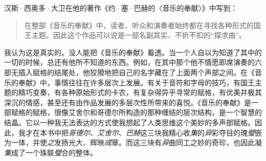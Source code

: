 汉斯·西奥多·大卫在他的著作《约·塞·巴赫的〈音乐的奉献〉》中写到：

\begin{quote}
在整部《音乐的奉献》中，读者、听众和演奏者始终都在寻找各种形式的国王主题。因此这个作品可以说是一部名副其实、不折不扣的“探求曲”。
\end{quote}

我认为这是真实的。没人能把《音乐的奉献》看透。当一个人自以为知道了其中的一切的时候，总还有他所不知道的东西。例如，在其中那个他不情愿即席演奏的六部无插入赋格的结尾处，他狡猾地把自己的名字藏在了上面两个声部之间。在《音乐的奉献》中，事情往往在许多层次上发展。有关于音符和字母的技巧，有国王主题的精巧变奏，有各种原始形式的卡农，有复杂得异乎寻常的赋格，有优美并极其深沉的情感，甚至还有由作品发展的多层次性所带来的喜悦。《音乐的奉献》是一部赋格的赋格，很像艾舍尔和哥德尔所构造的那种缠结的层次结构，是一个智慧的结晶。它以一种我无法表达的方式使我想起了人类思维这个美妙的多声部赋格。因此，我才在本书中把\emph{哥德尔}、\emph{艾舍尔}、\emph{巴赫}这三块我精心收\emph{集}的\emph{异}彩夺目的瑰\emph{璧}嵌为一体，并使\emph{之}发扬光大、辉映\emph{成}章。而这三块有\emph{异}曲同工之妙的奇珍，也因此凝\emph{集}成了一个珠联\emph{璧}合的整体。

